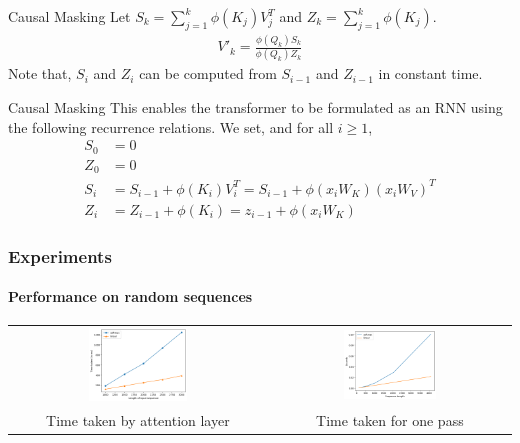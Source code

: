 \documentclass{beamer}
\begin{document}
    \begin{frame}{Causal Masking}
        Let $S_k = \sum_{j=1}^k \phi(K_j)V_j^T$ and $Z_k = \sum_{j=1}^k \phi(K_j)$.
        \begin{align*}
            V'_k=\frac{\phi(Q_k)S_k}{\phi(Q_k){Z_k}}
        \end{align*}
        Note that, $S_i$ and $Z_i$ can be computed from $S_{i-1}$ and $Z_{i-1}$ in constant time.
    \end{frame}
    \begin{frame}{Causal Masking}                
         This enables the transformer to be formulated as an RNN using the following recurrence relations. We set, and for all $i \ge 1$,
        \begin{align*}
            S_0 &= 0\\
            Z_0 &= 0\\
            S_i &= S_{i-1} + \phi(K_i)V_i^T = S_{i-1} + \phi(x_iW_K)(x_iW_V)^T \\
            Z_i &= Z_{i-1} + \phi(K_i) = z_{i-1} + \phi(x_iW_K)
        \end{align*}
    \end{frame}
    
    \begin{frame}
    \frametitle{Experiments}
        \framesubtitle{Performance on random sequences}

        \begin{center}
           \begin{tabular}{cc}
             \centering
             \includegraphics[width=0.4\textwidth]{images/attentiontimemeasure.png}&
             \includegraphics[width=0.4\textwidth]{images/forbacvstime.png}\\
             Time taken by attention layer & Time taken for one pass \\
            \end{tabular}  
        \end{center}
    \end{frame}
\end{document}
